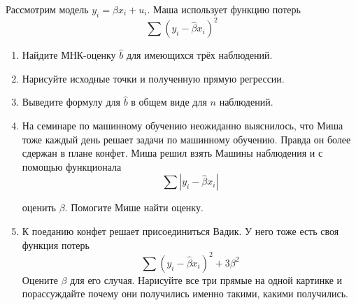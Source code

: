 \documentclass[12pt, a4paper, oneside]{article}
\begin{document}
Рассмотрим модель $y_i = \beta x_i + u_i$. Маша использует функцию потерь 
\[
\sum (y_i - \hat \beta x_i )^2
\]

\begin{enumerate}
	\item Найдите МНК-оценку $\hat b$ для имеющихся трёх наблюдений.
	\item Нарисуйте исходные точки и полученную прямую
	регрессии.
	\item Выведите формулу для $\hat b$ в общем виде для $n$ наблюдений.
	\item На семинаре по машинному обучению неожиданно выяснилось, что Миша тоже каждый день решает задачи по машинному обучению. Правда он более сдержан в плане конфет. Миша решил взять Машины наблюдения и с помощью функционала 
	\[
	\sum |y_i - \hat \beta x_i |
	\]  
	
	оценить $\beta$. Помогите Мише найти оценку. 
	\item К поеданию конфет решает присоединиться Вадик. У него тоже есть своя функция потерь
	\[
	\sum (y_i - \hat \beta x_i)^2 + 3\beta^2
	\]  	
	Оцените $\beta$ для его случая. Нарисуйте все три прямые на одной картинке и порассуждайте почему они получились именно такими, какими получились. 
\end{enumerate}
\end{document}
